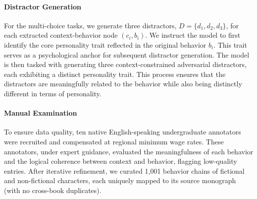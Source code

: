 







\paragraph{Distractor Generation}
For the multi-choice tasks, we generate three distractors, $D=\{d_1,d_2,d_3\}$, for each extracted context-behavior node $(c_i,b_i)$.  
We instruct the model to first identify the core personality trait reflected in the original behavior $b_i$.
This trait serves as a psychological anchor for subsequent distractor generation.
The model is then tasked with generating three context-constrained adversarial distractors, each exhibiting a distinct personality trait. This process ensures that the distractors are meaningfully related to the behavior while also being distinctly different in terms of personality.



\paragraph{Manual Examination}


To ensure data quality, ten native English-speaking undergraduate annotators were recruited and compensated at regional minimum wage rates.
These annotators, under expert guidance, evaluated the meaningfulness of each behavior and the logical coherence between context and behavior, flagging low-quality entries.
After iterative refinement, we curated 1,001 behavior chains of fictional and non-fictional characters, each uniquely mapped to its source monograph (with no cross-book duplicates).





